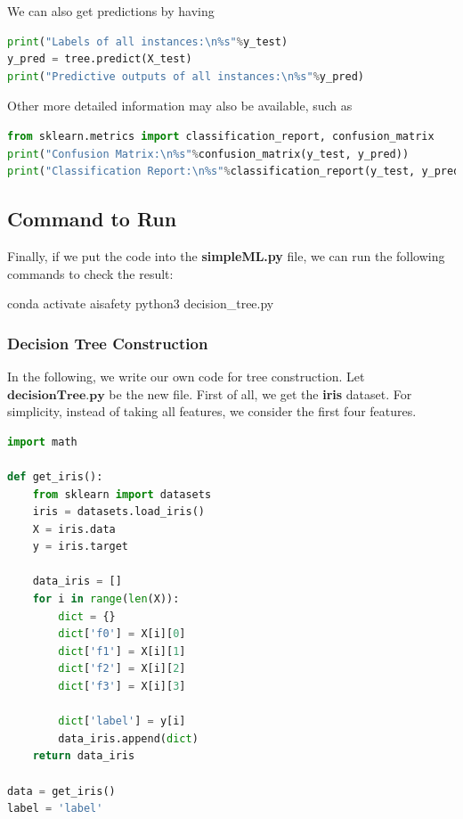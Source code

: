 We can also get predictions by having 
\begin{lstlisting}[language=Python]
print("Labels of all instances:\n%s"%y_test)
y_pred = tree.predict(X_test)
print("Predictive outputs of all instances:\n%s"%y_pred)
\end{lstlisting}

Other more detailed information may also be  available, such as 
\begin{lstlisting}[language=Python]
from sklearn.metrics import classification_report, confusion_matrix
print("Confusion Matrix:\n%s"%confusion_matrix(y_test, y_pred))
print("Classification Report:\n%s"%classification_report(y_test, y_pred))
\end{lstlisting}

\subsection*{Command to Run} 

Finally, if we put the code into the \textbf{simpleML.py} file, we can run the following commands to check the result: 

\begin{cmds}
conda activate aisafety
python3 decision_tree.py
\end{cmds}




\subsubsection{Decision Tree Construction}

In the following, we write our own code for tree construction. Let $\textbf{decisionTree.py}$ be the new file. First of all, we get the \textbf{iris} dataset. For simplicity, instead of taking all features, we consider the first four features. 

\begin{lstlisting}[language=Python]
import math

def get_iris():
    from sklearn import datasets
    iris = datasets.load_iris()
    X = iris.data 
    y = iris.target

    data_iris = []
    for i in range(len(X)):
        dict = {}
        dict['f0'] = X[i][0]
        dict['f1'] = X[i][1]
        dict['f2'] = X[i][2]
        dict['f3'] = X[i][3]

        dict['label'] = y[i]
        data_iris.append(dict)
    return data_iris
    
data = get_iris()
label = 'label'
\end{lstlisting}

